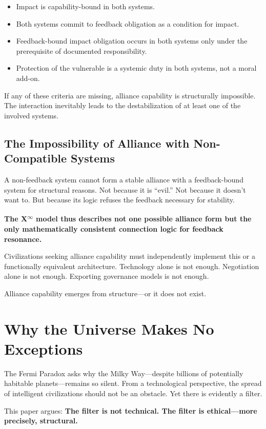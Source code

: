 \documentclass[12pt,a4paper]{article}
\begin{document}
\begin{itemize}
    \item Impact is capability-bound in both systems.
    \item Both systems commit to feedback obligation as a condition for impact.
    \item Feedback-bound impact obligation occurs in both systems only under the prerequisite of documented responsibility.
    \item Protection of the vulnerable is a systemic duty in both systems, not a moral add-on.
\end{itemize}

If any of these criteria are missing, alliance capability is structurally impossible.  
The interaction inevitably leads to the destabilization of at least one of the involved systems.

\subsection{The Impossibility of Alliance with Non-Compatible Systems}

A non-feedback system cannot form a stable alliance with a feedback-bound system for structural reasons.  
Not because it is “evil.” Not because it doesn’t want to. But because its logic refuses the feedback necessary for stability.

\textbf{The \texorpdfstring{X\textsuperscript{\(\infty\)}}{X-Infinity} model thus describes not one possible alliance form but the only mathematically consistent connection logic for feedback resonance.}

Civilizations seeking alliance capability must independently implement this or a functionally equivalent architecture.  
Technology alone is not enough.  
Negotiation alone is not enough.  
Exporting governance models is not enough.  

Alliance capability emerges from structure—or it does not exist.

\section{Why the Universe Makes No Exceptions}

The Fermi Paradox asks why the Milky Way—despite billions of potentially habitable planets—remains so silent.  
From a technological perspective, the spread of intelligent civilizations should not be an obstacle. Yet there is evidently a filter.

This paper argues:  
\textbf{The filter is not technical. The filter is ethical—more precisely, structural.}
\end{document}
